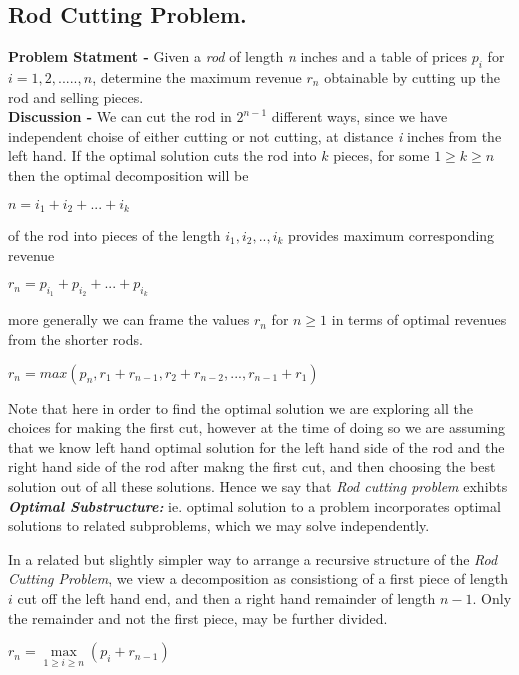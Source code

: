 \documentclass[10pt,a4paper,draft]{article}
\begin{document}
\subsection{Rod Cutting Problem.}
\textbf{Problem Statment -} Given a \emph{rod} of length \emph{n} inches and a table of prices $p_i$ for $i = 1,2,.....,n$, determine the maximum revenue $r_n$ obtainable by cutting up the rod and selling pieces.
\\[12pt]
\textbf{Discussion -} We can cut the rod in $2^{n-1}$ different ways, since we have independent choise of either cutting or not cutting, at distance \textit{i} inches from the left hand. If the optimal solution cuts the rod into $k$ pieces, for some $1 \geq k \geq n$ then the optimal decomposition will be
\begin{center}
$n = i_1+i_2+...+i_k$
\end{center}
of the rod into pieces of the length $i_1,i_2,..,i_k$ provides maximum corresponding revenue
\begin{center}
$r_n = p_{i_1}+p_{i_2}+...+p_{i_k}$
\end{center}
more generally we can frame the values $r_n$ for $n \geq 1$ in terms of optimal revenues from the shorter rods.
\begin{center}
$r_n = max(p_n,r_1+r_{n-1},r_2+r_{n-2},...,r_{n-1}+r_1)$
\end{center}
Note that here in order to find the optimal solution we are exploring all the choices for making the first cut, however at the time of doing so we are assuming that we know left hand optimal solution for the left hand side of the rod and the right hand side of the rod after makng the first cut, and then choosing the best solution out of all these solutions. Hence we say that \emph{Rod cutting problem} exhibts \textbf{\emph{Optimal Substructure:}} ie. optimal solution to a problem incorporates optimal solutions to related subproblems, which we may solve independently.
\par
In a related but slightly simpler way to arrange a recursive structure of the \emph{Rod Cutting Problem}, we view a decomposition as consistiong of a first piece of length $i$ cut off the left hand end, and then a right hand remainder of length $n-1$. Only the remainder and not the first piece, may be further divided.
\begin{center}
$r_n = \max\limits_{1 \geq i \geq n}(p_i+r_{n-1})$
\end{center}
\end{document}

